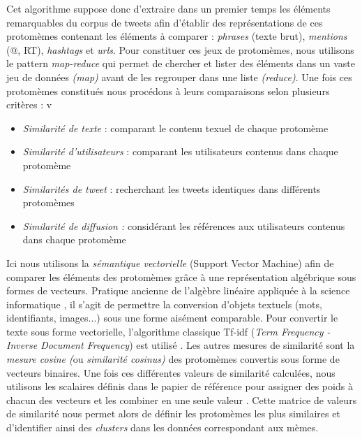 Cet algorithme suppose donc d{\textquoteright}extraire dans un premier
temps les \'el\'ements remarquables du corpus de tweets afin
d{\textquoteright}\'etablir des repr\'esentations de ces protom\`emes
contenant les \'el\'ements \`a comparer : \textit{phrases} (texte
brut), \textit{mentions }(@, RT), \textit{hashtags }et \textit{urls}.
Pour constituer ces jeux de protom\`emes, nous utilisons le pattern
\textit{map-reduce} qui permet de chercher et lister des \'el\'ements
dans un vaste jeu de donn\'ees \textit{(map)} avant de les regrouper
dans une liste \textit{(reduce)}. Une fois ces protom\`emes
constitu\'es nous proc\'edons \`a leurs comparaisons selon plusieurs
crit\`eres :
v
\begin{itemize}
\item \textit{Similarit\'e de texte }: comparant le contenu texuel de
chaque protom\`eme 
\item \textit{Similarit\'e d{\textquoteright}utilisateurs} : comparant
les utilisateurs contenus dans chaque protom\`eme
\item \textit{Similarit\'es de tweet }: recherchant les tweets
identiques dans diff\'erents protom\`emes
\item \textit{Similarit\'e de diffusion : }consid\'erant les
r\'ef\'erences aux utilisateurs contenus dans chaque protom\`eme
\end{itemize}
Ici nous utilisons la \textit{s\'emantique vectorielle} (Support Vector
Machine) afin de comparer les \'el\'ements des protom\`emes gr\^ace \`a
une repr\'esentation alg\'ebrique sous formes de vecteurs. Pratique
ancienne de l{\textquoteright}alg\`ebre lin\'eaire appliqu\'ee \`a la
science informatique \cite{Salton1975}, il s{\textquoteright}agit de
permettre la conversion d{\textquoteright}objets textuels (mots,
identifiants, images...) sous une forme ais\'ement comparable. Pour
convertir le texte sous forme vectorielle, l{\textquoteright}algorithme
classique Tf-idf (\textit{Term Frequency - Inverse Document Frequency})
est utilis\'e \cite{Soucy2005}. Les autres mesures de similarit\'e sont la
\textit{mesure cosine (}ou \textit{similarit\'e cosinus) }des
protom\`emes convertis sous forme de vecteurs binaires. Une fois ces
diff\'erentes valeurs de similarit\'e calcul\'ees, nous utilisons les
scalaires d\'efinis dans le papier de r\'ef\'erence pour assigner des
poids \`a chacun des vecteurs et les combiner en une seule valeur
\cite{Ferrara2013}. Cette matrice de valeurs de similarit\'e nous permet
alors de d\'efinir les protom\`emes les plus similaires et
d{\textquoteright}identifier ainsi des \textit{clusters }dans les
donn\'ees correspondant aux m\`emes.




